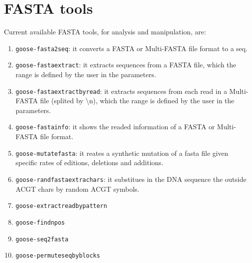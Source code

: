 \chapter{FASTA tools}
\label{fasta}

Current available FASTA tools, for analysis and manipulation, are:
\begin{enumerate}
\item \texttt{goose-fasta2seq}: it converts a FASTA or Multi-FASTA file format to a seq.
\item \texttt{goose-fastaextract}: it extracts sequences from a FASTA file, which the range is defined by the user in the parameters.
\item \texttt{goose-fastaextractbyread}: it extracts sequences from each read in a Multi-FASTA file (splited by \textbackslash n), which the range is defined by the user in the parameters.
\item \texttt{goose-fastainfo}: it shows the readed information of a FASTA or Multi-FASTA file format.
\item \texttt{goose-mutatefasta}: it reates a synthetic mutation of a fasta file given specific rates of editions, deletions and additions.
\item \texttt{goose-randfastaextrachars}: it substitues in the DNA sequence the outside ACGT chars by random ACGT symbols.
\item \texttt{goose-extractreadbypattern}
\item \texttt{goose-findnpos}
\item \texttt{goose-seq2fasta}
\item \texttt{goose-permuteseqbyblocks}

\end{enumerate}




 


%
%
%
%


